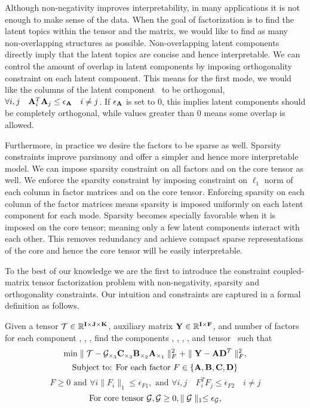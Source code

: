 Although non-negativity improves interpretability,  in many applications it is not enough to make sense of the data. When the goal of factorization is to find the latent topics within the tensor and the matrix, we would like to find as many non-overlapping structures as possible. Non-overlapping latent components directly imply that the latent topics are concise and hence interpretable.  We can control the amount of overlap in latent components by imposing orthogonality constraint on each latent component. This means for the first mode, we would like the columns of the latent component \factA\ to be orthogonal, $\forall i, j \quad {\ensuremath{\mathbf{A}}}_{i}^{T} {\mathbf{A}}_{j} \leq {\ensuremath{\epsilon_{\mathbf{A}}}} \quad i \neq j$. If $ {\epsilon_{\mathbf{A}}}$ is set to $0$, this implies latent components should be completely orthogonal, while values greater than $0$ means some overlap is allowed. 

Furthermore, in practice we desire the factors to be sparse as well. Sparsity constraints improve parsimony and offer a simpler and hence more interpretable model.  We can impose sparsity constraint on all factors and on the core tensor as well. We enforce the sparsity constraint by imposing constraint on $\ell_{1}$ norm of each column in factor matrices and on the core tensor. Enforcing sparsity on each column of the factor matrices means sparsity is imposed uniformly on each latent component for each mode. 
Sparsity becomes specially  favorable  when it is imposed on the core tensor; meaning only a few latent components interact with each other. This removes redundancy and achieve compact sparse representations of the core and hence the core tensor will be easily interpretable. 

To the best of our knowledge we are the first to introduce the constraint coupled-matrix tensor factorization problem with non-negativity, sparsity and orthogonality constraints.  
Our intuition and constraints  are captured in a formal definition as follows.
\begin{problem}[]\label{prob:constrainedCMTF}
Given a tensor ${\mathbf{\mathcal{T}}} \in {\mathbb R}^{{\mathbf{I}} \times {\ensuremath{\mathbf{J}}} \times {\ensuremath{\mathbf{K}}}}$, auxiliary matrix ${\mathbf{Y}} \in {\mathbb R}^{{\mathbf{I}} \times {\ensuremath{\mathbf{F}}}}$, and number of factors for each component \sizeFactA, \sizeFactB, \sizeFactC,  find the components \factA, \factB, \factC, \factD, and tensor \core\ such that
$$\min  \parallel{\ensuremath{\mathbf{\mathcal{T}}}} - {\mathbf{\mathcal{G}}}_{\times_{3}} {\mathbf{C}}_{\times_{3}} {\mathbf{B}}_{\times_{2}} {\mathbf{A}}_{\times_{1}}\parallel_{F}^{2} + \parallel {\ensuremath{\mathbf{Y}}} - {\mathbf{A}}{\mathbf{D}}^{T}  \parallel_{F}^{2},$$
$$  \text{Subject to: }  \text{For each factor  } F \in \lbrace {\ensuremath{\mathbf{A}}}, {\mathbf{B}}, {\mathbf{C}}, {\mathbf{D}} \rbrace$$
$$ F \geq 0 \text{ and } \forall i \parallel F_{i} \parallel_{1} \leq \epsilon_{F1}, 
\text{ and } \forall i, j \quad F_{i}^{T} F_{j} \leq \epsilon_{F2 } \quad i \neq j  $$
$$ \text{For core tensor } {\ensuremath{\mathbf{\mathcal{G}}}}, {\mathbf{\mathcal{G}}} \geq 0,  \parallel {\ensuremath{\mathbf{\mathcal{G}}}} \parallel_{1} \leq \epsilon_{{\mathbf{\mathcal{G}}}},$$
\end{problem}

